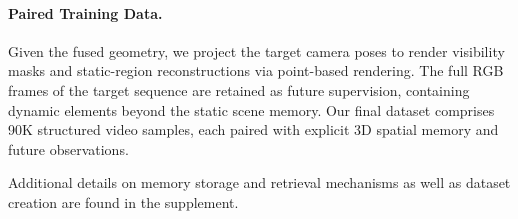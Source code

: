 
\paragraph{Paired Training Data.}
Given the fused geometry, we project the target camera poses to render visibility masks and static-region reconstructions via point-based rendering. The full RGB frames of the target sequence are retained as future supervision, containing dynamic elements beyond the static scene memory. Our final dataset comprises 90K structured video samples, each paired with explicit 3D spatial memory and future observations.

Additional details on memory storage and retrieval mechanisms as well as dataset creation are found in the supplement.




